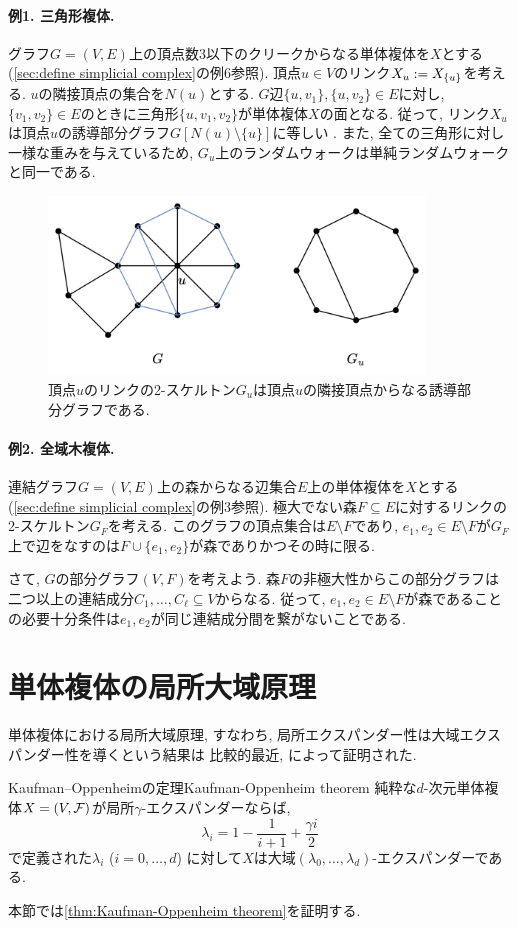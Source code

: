 \paragraph*{例1. 三角形複体.}
グラフ$G=(V,E)$上の頂点数$3$以下のクリークからなる単体複体を$X$とする (\cref{sec:define simplicial complex}の例6参照).
頂点$u \in V$のリンク$X_u \mathrel{:=} X_{\{u\}}$を考える.
$u$の隣接頂点の集合を$N(u)$とする.
$G$辺$\{u,v_1\},\{u,v_2\}\in E$に対し, $\{v_1,v_2\}\in E$のときに三角形$\{u,v_1,v_2\}$が単体複体$X$の面となる.
従って, リンク$X_u$は頂点$u$の誘導部分グラフ$G[N(u)\setminus\{u\}]$に等しい .
また, 全ての三角形に対し一様な重みを与えているため, $G_u$上のランダムウォークは単純ランダムウォークと同一である.
\begin{figure}
    \begin{center}
    \includegraphics[width=10cm]{images/localwalk1.png}
    \caption{頂点$u$のリンクの2-スケルトン$G_u$は頂点$u$の隣接頂点からなる誘導部分グラフである.}
    \end{center}
\end{figure}
\paragraph*{例2. 全域木複体.}
連結グラフ$G=(V,E)$上の森からなる辺集合$E$上の単体複体を$X$とする (\cref{sec:define simplicial complex}の例3参照).
極大でない森$F\subseteq E$に対するリンクの$2$-スケルトン$G_F$を考える.
このグラフの頂点集合は$E\setminus F$であり, $e_1,e_2 \in E \setminus F$が$G_F$上で辺をなすのは$F \cup \{e_1,e_2\}$が森でありかつその時に限る.

さて, $G$の部分グラフ$(V,F)$を考えよう.
森$F$の非極大性からこの部分グラフは二つ以上の連結成分$C_1,\dots,C_\ell \subseteq V$からなる.
従って, $e_1,e_2\in E\setminus F$が森であることの必要十分条件は$e_1,e_2$が同じ連結成分間を繋がないことである.



\section{単体複体の局所大域原理}
単体複体における局所大域原理,
すなわち, 局所エクスパンダー性は大域エクスパンダー性を導くという結果は
比較的最近, \citet{KO20}によって証明された.
\begin{theorem}{Kaufman--Oppenheimの定理}{Kaufman-Oppenheim theorem}
    純粋な$d$-次元単体複体$X = (V,\mathcal{F})$が局所$\gamma$-エクスパンダーならば,
    \[ \lambda_i = 1-\frac{1}{i+1} + \frac{\gamma i}{2}\]
    で定義された$\lambda_i$ ($i=0,\dots,d$) に対して$X$は大域$(\lambda_0,\dots,\lambda_{d})$-エクスパンダーである.
\end{theorem}
本節では\cref{thm:Kaufman-Oppenheim theorem}を証明する.

